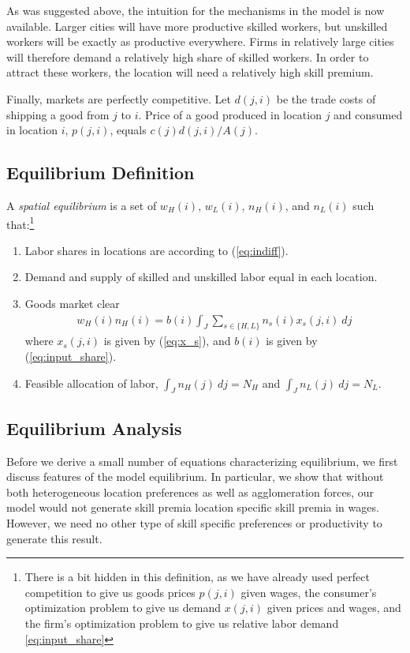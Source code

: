 \documentclass{article}
\begin{document}
As was suggested above, the intuition for the mechanisms in the model is now available.  Larger cities will have more productive skilled workers, but unskilled workers will be exactly as productive everywhere.  Firms in relatively large cities will therefore demand a relatively high share of skilled workers.  In order to attract these workers, the location will need a relatively high skill premium.

Finally, markets are perfectly competitive. Let $d(j,i)$ be the trade costs of shipping a good from $j$ to $i$. Price of a good produced in location $j$ and consumed in location $i$, $p(j,i)$, equals $c(j)d(j,i)/A(j)$. 

\subsection{Equilibrium Definition}

A \textit{spatial equilibrium} is a set of $w_H(i)$, $w_L(i)$, $n_H(i)$, and $n_L(i)$ such that:\footnote{There is a bit hidden in this definition, as we have already used perfect competition to give us goods prices $p(j,i)$ given wages, the consumer's optimization problem to give us demand $x(j,i)$ given prices and wages, and the firm's optimization problem to give us relative labor demand \eqref{eq:input_share}}
\begin{enumerate}
\item Labor shares in locations are according to (\ref{eq:indiff}).
\item Demand and supply of skilled and unskilled labor equal in each location.
\item Goods market clear
\begin{eqnarray}\label{eq:goods_mkt_clear}
	w_H(i) n_H(i) =  b(i) \int_J \sum_{s \in \{H,L\}} n_s(i)x_s(j,i) ~dj 
\end{eqnarray}
where $x_s(j,i)$ is given by (\ref{eq:x_s}), and $b(i)$ is given by (\ref{eq:input_share}).
\item Feasible allocation of labor, $\int_J n_H(j) ~dj = N_H$ and $\int_J n_L(j) ~dj = N_L$.
\end{enumerate}

\vspace{5mm}
\subsection{Equilibrium Analysis}

Before we derive a small number of equations characterizing equilibrium, we first discuss features of the model equilibrium.  In particular, we show that without both heterogeneous location preferences as well as agglomeration forces, our model would not generate skill premia location specific skill premia in wages.  However, we need no other type of skill specific preferences or productivity to generate this result.
\end{document}
